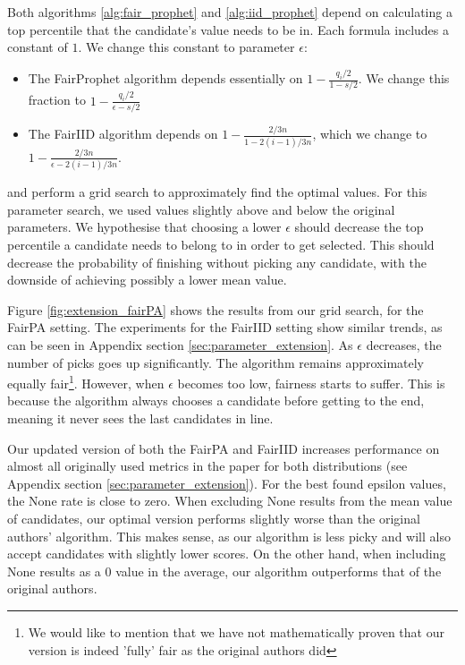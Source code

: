 Both algorithms \ref{alg:fair_prophet} and \ref{alg:iid_prophet} depend on calculating a top percentile that the candidate's value needs to be in. Each formula includes a constant of $1$. We change this constant to parameter $\epsilon$:

\begin{itemize}
    \item The FairProphet algorithm depends essentially on $1 - \frac{q_i/2}{1-s/2}$. We change this fraction to $1 - \frac{q_i/2}{\epsilon-s/2}$
    \item The FairIID algorithm depends on $1-\frac{2/3n}{1 - 2(i-1)/3n}$, which we change to $1-\frac{2/3n}{\epsilon - 2(i-1)/3n}$.
\end{itemize}
and perform a grid search to approximately find the optimal values. For this parameter search, we used values slightly above and below the original parameters. We hypothesise that choosing a lower $\epsilon$ should decrease the top percentile a candidate needs to belong to in order to get selected. This should decrease the probability of finishing without picking any candidate, with the downside of achieving possibly a lower mean value. 

Figure \ref{fig:extension_fairPA} shows the results from our grid search, for the FairPA setting. The experiments for the FairIID setting show similar trends, as can be seen in Appendix section \ref{sec:parameter_extension}. As $\epsilon$ decreases, the number of picks goes up significantly. The algorithm remains approximately equally fair\footnote{We would like to mention that we have not mathematically proven that our version is indeed 'fully' fair as the original authors did}. However, when $\epsilon$ becomes too low, fairness starts to suffer. This is because the algorithm always chooses a candidate before getting to the end, meaning it never sees the last candidates in line.

Our updated version of both the FairPA and FairIID increases performance on almost all originally used metrics in the paper for both distributions (see Appendix section \ref{sec:parameter_extension}). For the best found epsilon values, the None rate is close to zero. When excluding None results from the mean value of candidates, our optimal version performs slightly worse than the original authors' algorithm. This makes sense, as our algorithm is less picky and will also accept candidates with slightly lower scores. On the other hand, when including None results as a $0$ value in the average, our algorithm outperforms that of the original authors.

